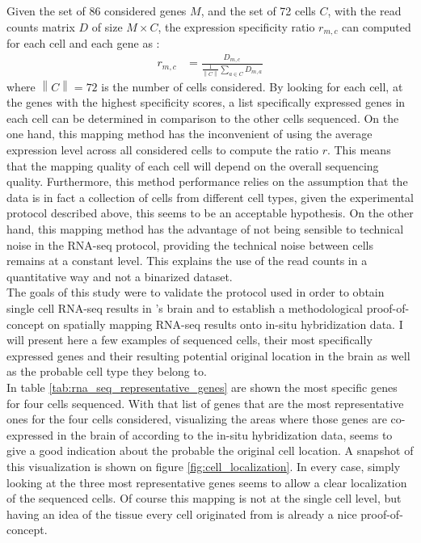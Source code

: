 	Given the set of 86 considered genes $M$, and the set of 72 cells $C$, with the read counts matrix $D$ of size $M\times C$, the expression specificity ratio $r_{m,c}$ can computed for each cell and each gene as :
\begin{eqnarray*}
	r_{m,c} &= \frac{D_{m,c}}{\frac{1}{\left\|C\right\|}\sum_{a \in C}D_{m,a}}
\end{eqnarray*}
where $\left\|C\right\| = 72 $ is the number of cells considered. By looking for each cell, at the genes with the highest specificity scores, a list specifically expressed genes in each cell can be determined in comparison to the other cells sequenced. On the one hand, this mapping method has the inconvenient of using the average expression level across all considered cells to compute the ratio $r$. This means that the mapping quality of each cell will depend on the overall sequencing quality. Furthermore, this method performance relies on the assumption that the data is in fact a collection of cells from different cell types, given the experimental protocol described above, this seems to be an acceptable hypothesis. On the other hand, this mapping method has the advantage of not being sensible to technical noise in the RNA-seq protocol, providing the technical noise between cells remains at a constant level. This explains the use of the read counts in a quantitative way and not a binarized dataset.\\

	The goals of this study were to validate the protocol used in order to obtain single cell RNA-seq results in \platy{}'s brain and to establish a methodological proof-of-concept on spatially mapping RNA-seq results onto in-situ hybridization data. I will present here a few examples of sequenced cells, their most specifically expressed genes and their resulting potential original location in the brain as well as the probable cell type they belong to.\\
	
	In table \ref{tab:rna_seq_representative_genes} are shown the most specific genes for four cells sequenced. With that list of genes that are the most representative ones for the four cells considered, visualizing the areas where those genes are co-expressed in the brain of \platy{} according to the in-situ hybridization data, seems to give a good indication about the probable the original cell location. A snapshot of this visualization is shown on figure \ref{fig:cell_localization}. In every case, simply looking at the three most representative genes seems to allow a clear localization of the sequenced cells. Of course this mapping is not at the single cell level, but having an idea of the tissue every cell originated from is already a nice proof-of-concept.\\
	

